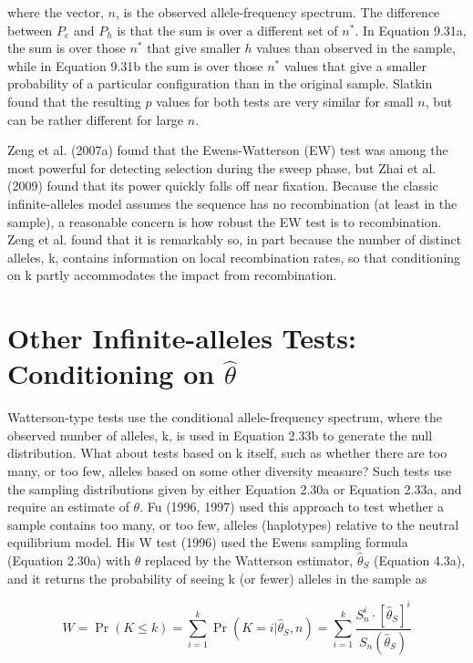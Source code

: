 \documentclass{article}
\begin{document}
where the vector, $n$, is the observed allele-frequency spectrum. The difference between $P_e$ and $P_h$ is that the sum is over a different set of $n^*$. In Equation 9.31a, the sum is over those $n^*$ that give smaller $h$ values than observed in the sample, while in Equation 9.31b the sum is over those $n^*$ values that give a smaller probability of a particular configuration than in the original sample. Slatkin found that the resulting $p$ values for both tests are very similar for small $n$, but can be rather different for large $n$.

Zeng et al. (2007a) found that the Ewens-Watterson (EW) test was among the most powerful for detecting selection during the sweep phase, but Zhai et al. (2009) found that its power quickly falls off near fixation. Because the classic infinite-alleles model assumes the sequence has no recombination (at least in the sample), a reasonable concern is how robust the EW test is to recombination. Zeng et al. found that it is remarkably so, in part because the number of distinct alleles, k, contains information on local recombination rates, so that conditioning on k partly accommodates the impact from recombination.

\section{Other Infinite-alleles Tests: Conditioning on  $ \hat{\theta} $}
Watterson-type tests use the conditional allele-frequency spectrum, where the observed number of alleles, k, is used in Equation 2.33b to generate the null distribution. What about tests based on k itself, such as whether there are too many, or too few, alleles based on some other diversity measure? Such tests use the sampling distributions given by either Equation 2.30a or Equation 2.33a, and require an estimate of  $ \theta $. Fu (1996, 1997) used this approach to test whether a sample contains too many, or too few, alleles (haplotypes) relative to the neutral equilibrium model. His W test (1996) used the Ewens sampling formula (Equation 2.30a) with  $ \theta $ replaced by the Watterson estimator,  $ \widehat{\theta}_{S} $ (Equation 4.3a), and it returns the probability of seeing k (or fewer) alleles in the sample as

\begin{equation}
W=\Pr(K\leq k)=\sum_{i=1}^{k}\Pr(K=i|\widehat{\theta}_{S},n)=\sum_{i=1}^{k}\frac{S_{n}^{i}\cdot[\widehat{\theta}_{S}]^{i}}{S_{n}(\widehat{\theta}_{S})}
\tag{9.32}
\label{eq:9_32}
\end{equation}
\end{document}
